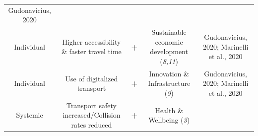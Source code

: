 \documentclass[
]{book}
\begin{document}
\begin{longtable}[]{@{}ccccc@{}}
\begin{minipage}[t]{0.17\columnwidth}
Gudonavicius, 2020\strut
\end{minipage}\tabularnewline
\begin{minipage}[t]{0.17\columnwidth}\centering
Individual\strut
\end{minipage} & \begin{minipage}[t]{0.16\columnwidth}\centering
Higher accessibility \& faster travel time\strut
\end{minipage} & \begin{minipage}[t]{0.17\columnwidth}\centering
\textbf{+}\strut
\end{minipage} & \begin{minipage}[t]{0.17\columnwidth}\centering
Sustainable economic development (\emph{8,11})\strut
\end{minipage} & \begin{minipage}[t]{0.17\columnwidth}\centering
Gudonavicius, 2020; Marinelli et al., 2020\strut
\end{minipage}\tabularnewline
\begin{minipage}[t]{0.17\columnwidth}\centering
Individual\strut
\end{minipage} & \begin{minipage}[t]{0.16\columnwidth}\centering
Use of digitalized transport\strut
\end{minipage} & \begin{minipage}[t]{0.17\columnwidth}\centering
\textbf{+}\strut
\end{minipage} & \begin{minipage}[t]{0.17\columnwidth}\centering
Innovation \& Infrastructure (\emph{9})\strut
\end{minipage} & \begin{minipage}[t]{0.17\columnwidth}\centering
Gudonavicius, 2020; Marinelli et al., 2020\strut
\end{minipage}\tabularnewline
\begin{minipage}[t]{0.17\columnwidth}\centering
Systemic\strut
\end{minipage} & \begin{minipage}[t]{0.16\columnwidth}\centering
Transport safety increased/Collision rates reduced\strut
\end{minipage} & \begin{minipage}[t]{0.17\columnwidth}\centering
\textbf{+}\strut
\end{minipage} & \begin{minipage}[t]{0.17\columnwidth}\centering
Health \& Wellbeing (\emph{3})\strut
\end{minipage} & \begin{minipage}[t]{0.17\columnwidth}\centering

\end{minipage}
\end{longtable}
\end{document}
